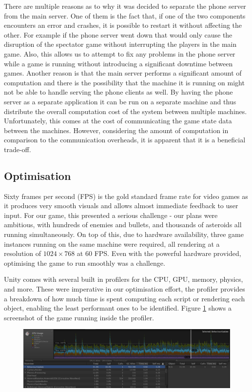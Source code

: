 \documentclass[a4paper,11pt]{article}
\begin{document}
There are multiple reasons as to why it was decided to separate the phone server from the main server. One of them is the fact that, if one of the two components encounters an error and crashes, it is possible to restart it without affecting the other. For example if the phone server went down that would only cause the disruption of the spectator game without interrupting the players in the main game. Also, this allows us to attempt to fix any problems in the phone server while a game is running without introducing a significant downtime between games. Another reason is that the main server performs a significant amount of computation and there is the possibility that the machine it is running on might not be able to handle serving the phone clients as well. By having the phone server as a separate application it can be run on a separate machine and thus distribute the overall computation cost of the system between multiple machines. Unfortunately, this comes at the cost of communicating the game state data between the machines. However, considering the amount of computation in comparison to the communication overheads, it is apparent that it is a beneficial trade-off.

\subsection{Optimisation}
Sixty frames per second (FPS) is the gold standard frame rate for video games as it produces very smooth visuals and allows almost immediate feedback to user input. For our game, this presented a serious challenge - our plans were ambitious, with hundreds of enemies and bullets, and thousands of asteroids all running simultaneously. On top of this, due to hardware availability, three game instances running on the same machine were required, all rendering at a resolution of $1024 \times 768$ at 60 FPS. Even with the powerful hardware provided, optimising the game to run smoothly was a challenge.

Unity comes with several built in profilers for the CPU, GPU, memory, physics, and more. These were imperative in our optimisation effort, the profiler provides a breakdown of how much time is spent computing each script or rendering each object, enabling the least performant ones to be identified. Figure \ref{fig:profiler} shows a screenshot of the game running inside the profiler.

\begin{figure}[ht]
	\centering
	\includegraphics[width=\textwidth]{images/profiler}
    \label{fig:profiler}
\end{figure}
\end{document}

